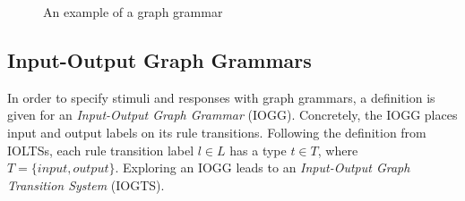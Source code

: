 \begin{figure}[ht]
  \begin{center}
    \hspace{20px}
    \hspace{20px}
    
    \hspace{20px}
    \hspace{20px}
  \end{center}
  \caption{An example of a graph grammar}
  \label{fig:gts}
\end{figure}

\subsection{Input-Output Graph Grammars}
In order to specify stimuli and responses with graph grammars, a definition is given for an \textit{Input-Output Graph Grammar} (IOGG). Concretely, the IOGG places input and output labels on its rule transitions. Following the definition from IOLTSs, each rule transition label $l \in L$ has a type $t \in T$, where $T = \{input, output\}$. Exploring an IOGG leads to an \textit{Input-Output Graph Transition System} (IOGTS).
